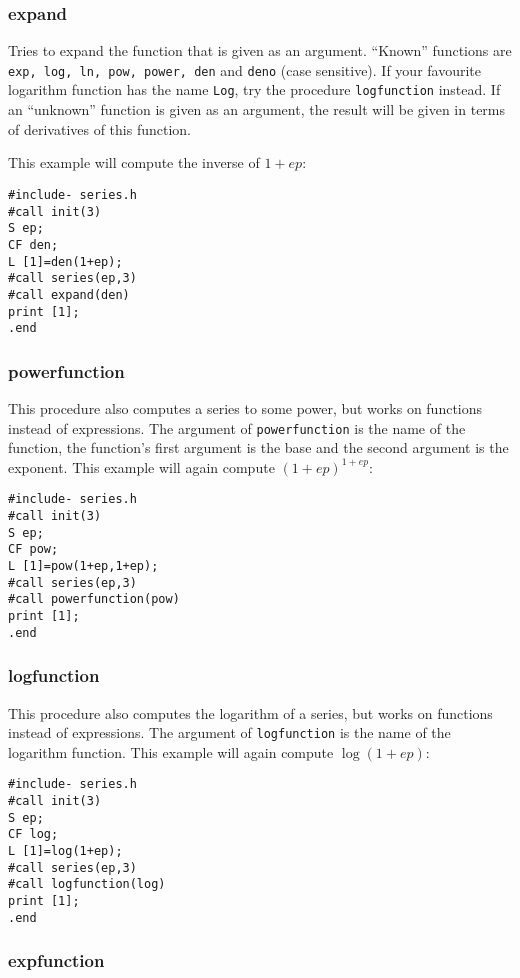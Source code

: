 \documentclass{article}
\begin{document}
\subsubsection{expand}
\label{sec:expand}

Tries to expand the function that is given as an argument. ``Known''
functions are {\tt exp, log, ln, pow, power, den} and {\tt deno} (case sensitive). If
your favourite logarithm function has the name {\tt Log}, try the
procedure {\tt logfunction} instead. If an ``unknown'' function is given
as an argument, the result will be given in terms of derivatives of this function.

This example will compute the
inverse of $1+ep$:
\begin{verbatim}
#include- series.h
#call init(3)
S ep;
CF den;
L [1]=den(1+ep);
#call series(ep,3)
#call expand(den)
print [1];
.end
\end{verbatim}

\subsubsection{powerfunction}
\label{sec:pow_fun}

This procedure also computes a series to some power, but works on
functions instead of expressions. The argument of {\tt powerfunction} is
the name of the function, the function's first argument is the base and
the second argument is the exponent. This example will again compute $(1+ep)^{1+ep}$:
\begin{verbatim}
#include- series.h
#call init(3)
S ep;
CF pow;
L [1]=pow(1+ep,1+ep);
#call series(ep,3)
#call powerfunction(pow)
print [1];
.end
\end{verbatim}

\subsubsection{logfunction}
\label{sec:log_fun}

This procedure also computes the logarithm of a series, but works on
functions instead of expressions. The argument of {\tt logfunction} is
the name of the logarithm function. This example will again compute $\log(1+ep)$:
\begin{verbatim}
#include- series.h
#call init(3)
S ep;
CF log;
L [1]=log(1+ep);
#call series(ep,3)
#call logfunction(log)
print [1];
.end
\end{verbatim}

\subsubsection{expfunction}
\label{sec:exp_fun}
\end{document}
